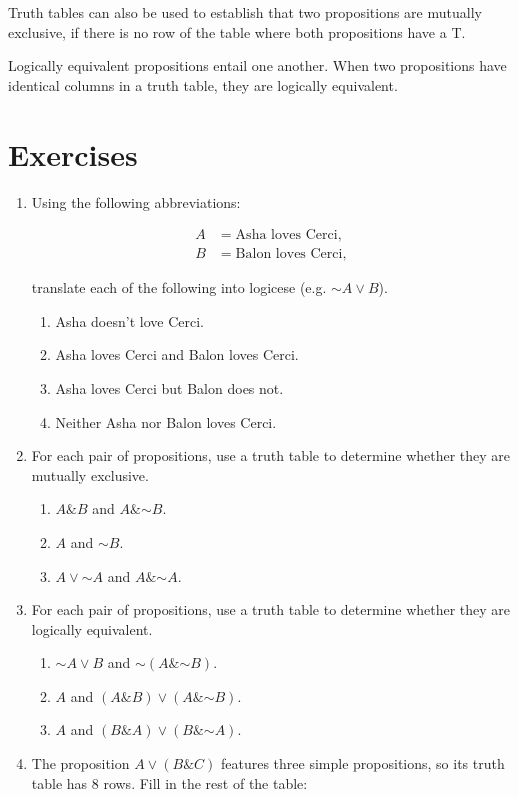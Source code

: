 \documentclass[justified]{tufte-book}
\providecommand{\tightlist}{%
  \setlength{\itemsep}{0pt}\setlength{\parskip}{0pt}}
\renewcommand{\neg}{\mathbin{\sim}}
\renewcommand{\wedge}{\mathbin{\&}}
\theoremstyle{definition}
\theoremstyle{definition}
\theoremstyle{definition}
\theoremstyle{remark}
\begin{document}
Truth tables can also be used to establish that two propositions are mutually exclusive, if there is no row of the table where both propositions have a T.

Logically equivalent propositions entail one another. When two propositions have identical columns in a truth table, they are logically equivalent.

\hypertarget{exercises-2}{%
\section*{Exercises}\label{exercises-2}}

\begin{enumerate}
\item
  Using the following abbreviations:

  \[
    \begin{aligned}
       A &= \mbox{Asha loves Cerci},\\
       B &= \mbox{Balon loves Cerci},
    \end{aligned}
  \]

  translate each of the following into logicese (e.g. \(\neg A \vee B\)).

  \begin{enumerate}
  \def\labelenumii{\alph{enumii}.}
  \tightlist
  \item
    Asha doesn't love Cerci.
  \item
    Asha loves Cerci and Balon loves Cerci.
  \item
    Asha loves Cerci but Balon does not.
  \item
    Neither Asha nor Balon loves Cerci.
  \end{enumerate}
\item
  For each pair of propositions, use a truth table to determine whether they are mutually exclusive.

  \begin{enumerate}
  \def\labelenumii{\alph{enumii}.}
  \tightlist
  \item
    \(A \wedge B\) and \(A \wedge \neg B\).
  \item
    \(A\) and \(\neg B\).
  \item
    \(A \vee \neg A\) and \(A \wedge \neg A\).
  \end{enumerate}
\item
  For each pair of propositions, use a truth table to determine whether they are logically equivalent.

  \begin{enumerate}
  \def\labelenumii{\alph{enumii}.}
  \tightlist
  \item
    \(\neg A \vee B\) and \(\neg (A \wedge \neg B)\).
  \item
    \(A\) and \((A \wedge B) \vee (A \wedge \neg B)\).
  \item
    \(A\) and \((B \wedge A) \vee (B \wedge \neg A)\).
  \end{enumerate}
\item
  The proposition \(A \vee (B \wedge C)\) features three simple propositions, so its truth table has 8 rows. Fill in the rest of the table:


\end{enumerate}
\end{document}
